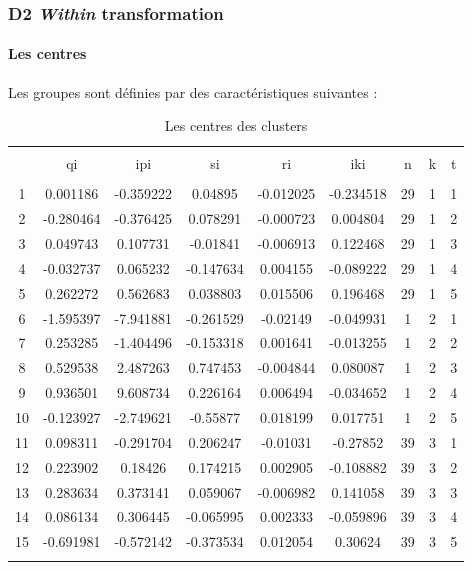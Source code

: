 \documentclass[11pt,]{article}
\let\oldparagraph\paragraph
\renewcommand{\paragraph}[1]{\oldparagraph{#1}\mbox{}}
\begin{document}
\FloatBarrier

\hypertarget{d2-within-transformation}{%
\subsubsection{\texorpdfstring{D2 \emph{Within}
transformation}{D2 Within transformation}}\label{d2-within-transformation}}

\hypertarget{les-centres}{%
\paragraph{Les centres}\label{les-centres}}

Les groupes sont définies par des caractéristiques suivantes :

\FloatBarrier

\begin{table}[!htbp] \centering 
  \caption{Les centres des clusters} 
  \label{} 
\begin{tabular}{@{\extracolsep{5pt}} ccccccccc} 
\\[-1.8ex]\hline 
\hline \\[-1.8ex] 
 & qi & ipi & si & ri & iki & n & k & t \\ 
\hline \\[-1.8ex] 
1 & 0.001186 & -0.359222 & 0.04895 & -0.012025 & -0.234518 & 29 & 1 & 1 \\ 
2 & -0.280464 & -0.376425 & 0.078291 & -0.000723 & 0.004804 & 29 & 1 & 2 \\ 
3 & 0.049743 & 0.107731 & -0.01841 & -0.006913 & 0.122468 & 29 & 1 & 3 \\ 
4 & -0.032737 & 0.065232 & -0.147634 & 0.004155 & -0.089222 & 29 & 1 & 4 \\ 
5 & 0.262272 & 0.562683 & 0.038803 & 0.015506 & 0.196468 & 29 & 1 & 5 \\ 
6 & -1.595397 & -7.941881 & -0.261529 & -0.02149 & -0.049931 & 1 & 2 & 1 \\ 
7 & 0.253285 & -1.404496 & -0.153318 & 0.001641 & -0.013255 & 1 & 2 & 2 \\ 
8 & 0.529538 & 2.487263 & 0.747453 & -0.004844 & 0.080087 & 1 & 2 & 3 \\ 
9 & 0.936501 & 9.608734 & 0.226164 & 0.006494 & -0.034652 & 1 & 2 & 4 \\ 
10 & -0.123927 & -2.749621 & -0.55877 & 0.018199 & 0.017751 & 1 & 2 & 5 \\ 
11 & 0.098311 & -0.291704 & 0.206247 & -0.01031 & -0.27852 & 39 & 3 & 1 \\ 
12 & 0.223902 & 0.18426 & 0.174215 & 0.002905 & -0.108882 & 39 & 3 & 2 \\ 
13 & 0.283634 & 0.373141 & 0.059067 & -0.006982 & 0.141058 & 39 & 3 & 3 \\ 
14 & 0.086134 & 0.306445 & -0.065995 & 0.002333 & -0.059896 & 39 & 3 & 4 \\ 
15 & -0.691981 & -0.572142 & -0.373534 & 0.012054 & 0.30624 & 39 & 3 & 5 \\ 
\hline \\[-1.8ex] 
\end{tabular} 
\end{table}
\end{document}
